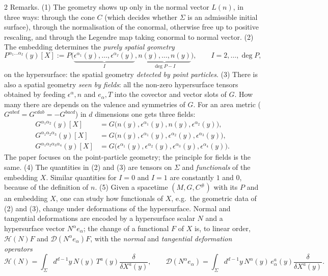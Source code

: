 \begin{paracol}{2}
Remarks. (1) The geometry shows up only in the normal vector $L(n)$, in three ways: through the cone $C$ (which decides whether $\Sigma$ is an admissible initial surface), through the normalisation of the conormal, otherwise free up to positive rescaling, and through the Legendre map taking conormal to normal vector. (2) The embedding determines the \emph{purely spatial geometry}
\[
  P^{\alpha_1\dots\alpha_I}(y)[X]:=P\bigl(\underbrace{\epsilon^{\alpha_1}(y),\dots,\epsilon^{\alpha_I}(y)}_{I},\underbrace{n(y),\dots,n(y)}_{\deg P-I}\bigr),\qquad I=2,\dots,\deg P,
\]
on the hypersurface: the spatial geometry \emph{detected by point particles}. (3) There is also a spatial geometry \emph{seen by fields}: all the non-zero hypersurface tensors obtained by feeding $\epsilon^\alpha,n$ and $e_\alpha,T$ into the covector and vector slots of $G$. How many there are depends on the valence and symmetries of $G$. For an area metric ($G^{abcd}=G^{cdab}=-G^{bacd}$) in $d$ dimensions one gets three fields:
\begin{align*}
  G^{\alpha_1\alpha_2}(y)[X]&=G\bigl(n(y),\epsilon^{\alpha_1}(y),n(y),\epsilon^{\alpha_2}(y)\bigr),\\
  G^{\alpha_1\alpha_2\alpha_3}(y)[X]&=G\bigl(n(y),\epsilon^{\alpha_1}(y),\epsilon^{\alpha_2}(y),\epsilon^{\alpha_3}(y)\bigr),\\
  G^{\alpha_1\alpha_2\alpha_3\alpha_4}(y)[X]&=G\bigl(\epsilon^{\alpha_1}(y),\epsilon^{\alpha_2}(y),\epsilon^{\alpha_3}(y),\epsilon^{\alpha_4}(y)\bigr).
\end{align*}
The paper focuses on the point-particle geometry; the principle for fields is the same. (4) The quantities in (2) and (3) are tensors on $\Sigma$ and \emph{functionals} of the embedding $X$. Similar quantities for $I=0$ and $I=1$ are constantly $1$ and $0$, because of the definition of $n$. (5) Given a spacetime $(M,G,C^\#)$ with its $P$ and an embedding $X$, one can study how functionals of $X$, e.g.\ the geometric data of (2) and (3), change under deformations of the hypersurface. Normal and tangential deformations are encoded by a hypersurface scalar $N$ and a hypersurface vector $N^\alpha e_\alpha$; the change of a functional $F$ of $X$ is, to linear order, $\mathcal H(N)F$ and $\mathcal D(N^\alpha e_\alpha)F$, with the \emph{normal} and \emph{tangential deformation operators}
\[
  \mathcal H(N)=\int_\Sigma d^{d-1}y\,N(y)\,T^a(y)\frac\delta{\delta X^a(y)},\qquad\mathcal D(N^\alpha e_\alpha)=\int_\Sigma d^{d-1}y\,N^\alpha(y)\,e^a_\alpha(y)\frac\delta{\delta X^a(y)}.
\]


\end{paracol}

